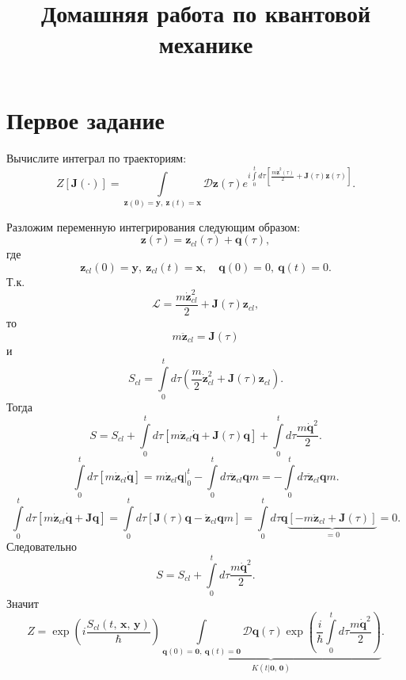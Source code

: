 \documentclass[a4paper]{article}
\title{Домашняя работа по квантовой механике}
\begin{document}
	\maketitle
\section*{Первое задание}
\begin{hiProb}[1]
Вычислите интеграл по траекториям:
\[
	Z[\mathbf{J}(\cdot )]= \int\limits_{\mathbf{z}(0)=
	\mathbf{y},\ \mathbf{z}(t)=\mathbf{x}}^{} 
	\mathcal{D} \mathbf{z}(\tau) e^{
	i \int\limits_{0}^{t} d\tau \left[ 
\frac{m\dot{\mathbf{z}}^2(\tau)}{2}+\mathbf{J}(\tau)
\mathbf{z}(\tau)\right]  }
.\] 
\end{hiProb}
\begin{sol}
Разложим переменную интегрирования следующим образом:
\[
	\mathbf{z}(\tau)=\mathbf{z}_{cl}(\tau)+\mathbf{q}(\tau)
,\]
где
\[
	\mathbf{z}_{cl}(0)=\mathbf{y},\
	\mathbf{z}_{cl}(t)=\mathbf{x},\quad
	\mathbf{q}(0)=0,\
	\mathbf{q}(t)=0
.\] 
Т.\:к.
\[
	\mathcal{L}= \frac{m \dot{\mathbf{z}}_{cl}^2}{2}+\mathbf{J}(\tau)\mathbf{z}_{cl}
,\]
то
\[
	m\ddot{\mathbf{z}}_{cl}=\mathbf{J}(\tau)
 \] 
и
\[
S_{cl}= \int\limits_{0}^{t} d\tau
\left( \frac{m}{2} \dot{\mathbf{z}}^2_{cl}+
\mathbf{J}(\tau) \mathbf{z}_{cl}\right) 
.\] 
Тогда
\[
S= S_{cl}+ \int\limits_{0}^{t} d\tau
\left[ m \dot{\mathbf{z}}_{cl}\dot{\mathbf{q}}+
\mathbf{J}(\tau) \mathbf{q}\right] +\int\limits_{0}^{t}  d\tau \frac{m \dot{\mathbf{q}}^2}{2}
.\] 
\[
\int\limits_{0}^{t}d \tau \left[ 
m \dot{\mathbf{z}}_{cl} \dot{\mathbf{q}}\right] = 
\left. m \dot{\mathbf{z}}_{cl} \mathbf{q} \right|_{0}^t 
	- \int\limits_{0}^{t}  d\tau \ddot{\mathbf{z}} _{cl}\mathbf{q}m
	=- \int\limits_{0}^{t}  d\tau \ddot{\mathbf{z}} _{cl}\mathbf{q}m
.\] 
\[
\int\limits_{0}^{t}d\tau \left[ 
m \dot{\mathbf{z}}_{cl} \dot{\mathbf{q}}+
\mathbf{J} \mathbf{q}\right] =
\int\limits_{0}^{t}  d\tau \left[ 
\mathbf{J}(\tau) \mathbf{q}-
\ddot{\mathbf{z}}_{cl}\mathbf{q} m\right] =
\int\limits_{0}^{t} d\tau
\mathbf{q} \underbrace{\left[ -m \ddot{\mathbf{z}}_{cl}
+\mathbf{J}(\tau)\right] }_{=0}=0
.\] 
Следовательно
\[
	S=S_{cl}+ \int\limits_{0}^{t} d\tau \frac{m \dot{\mathbf{q}}^2}{2} 
.\] 
Значит
\[
	Z= \exp \left( 
		i \frac{S_{cl}(t,\,\mathbf{x},\,\mathbf{y})}{\hbar  }\right) \underbrace{\int\limits_{\mathbf{q}(0)=\mathbf{0},\ 
	\mathbf{q}(t)=\mathbf{0}}
	\mathcal{D} \mathbf{q}(\tau)
	\exp \left( \frac{i}{\hbar }
\int\limits_{0}^{t} d\tau \frac{m \dot{\mathbf{q}}^2}{2} \right) }_{K(t| \mathbf{0},\,\mathbf{0})}
.\] 
\begin{multline*}

\end{multline*}
\end{sol}
\end{document}
